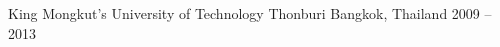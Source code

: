 

\begin{cventries}

    {King Mongkut's University of Technology Thonburi} %
    {Bangkok, Thailand} %
    {2009 -- 2013} %
    {}
    {}

\end{cventries}
